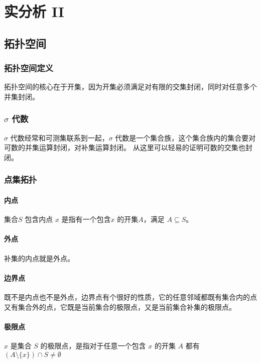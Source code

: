 \part{实分析 II}

\chapter{拓扑空间}

\section{拓扑空间定义}

拓扑空间的核心在于开集，因为开集必须满足对有限的交集封闭，同时对任意多个并集封闭。

\section{$ \sigma $ 代数}

$\sigma$ 代数经常和可测集联系到一起，$\sigma$ 代数是一个集合族，这个集合族内的集合要对可数的并集运算封闭，对补集运算封闭。
从这里可以轻易的证明可数的交集也封闭。

\section{点集拓扑}

\subsection{内点}
集合$S$ 包含内点 $x$ 是指有一个包含$x$ 的开集$A$，满足 $A \subseteq S$。

\subsection{外点}

补集的内点就是外点。 


\subsection{边界点}

既不是内点也不是外点，边界点有个很好的性质，它的任意邻域都既有集合内的点又有集合外的点，它既是当前集合的极限点，又是当前集合补集的极限点。

\subsection{极限点}
$x$ 是集合 $S$ 的极限点，是指对于任意一个包含 $x$ 的开集 $A$ 都有 $ (A \setminus \{ x \}) \cap S \ne \emptyset$

